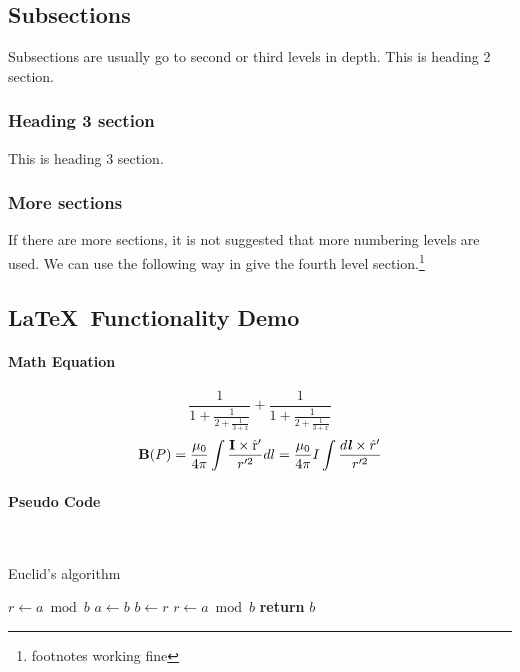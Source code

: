 \documentclass[12pt]{article}
\begin{document}
\subsection{Subsections}
Subsections are usually go to second or third levels in depth. This is heading 2 section.
\subsubsection{Heading 3 section}
This is heading 3 section.
\subsubsection{More sections}
If there are more sections, it is not suggested that more numbering levels are used. We can use the following way in give the fourth level section.\footnote{footnotes working fine}
\subsection{\LaTeX~Functionality Demo}
\paragraph{Math Equation}
\begin{equation}
    \frac{1}{\displaystyle 1+
    \frac{1}{\displaystyle 2+
    \frac{1}{\displaystyle 3+x}}} +
    \frac{1}{1+\frac{1}{2+\frac{1}{3+x}}}
\end{equation}
\begin{equation}
    \textrm{\textbf{B}}(P)=\frac{\mu_0}{4\pi}\int\frac{\rm\textbf{I} \times \hat{r}'}{r'^2}dl=\frac{\mu_0}{4\pi}I\int\frac{d\textbf{\textit{l}} \times \hat{r}'}{r'^2}
\end{equation}
\paragraph{Pseudo Code}\mbox{}\\
\begin{algorithm}
    \caption{Euclid’s algorithm}\label{euclid}
    \begin{algorithmic}[1]
    \State $r\gets a\bmod b$
    \State $a\gets b$
    \State $b\gets r$
    \State $r\gets a\bmod b$
    \EndWhile\label{euclidendwhile}
    \State \textbf{return} $b$
    \EndProcedure
    \end{algorithmic}
\end{algorithm}
\end{document}
